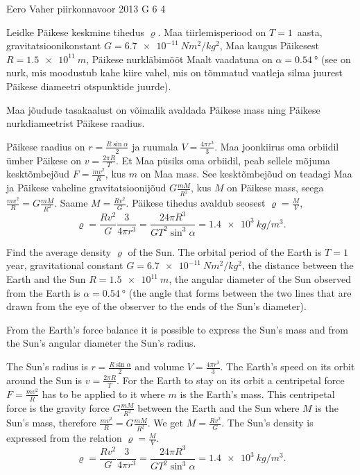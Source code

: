 {Eero Vaher} %
{piirkonnavoor} %
{2013} %
{G 6} %
{4} %
{
\ifStatement
Leidke Päikese keskmine tihedus $\varrho$. Maa
tiirlemisperiood on $T=1$~aasta, gravitatsioonikonstant 
$G=\SI{6.7e-11}{N m^2/kg^2}$, Maa kaugus Päikesest $R=\SI{1.5e11}{m}$, Päikese nurkläbimõõt Maalt vaadatuna on
$\alpha=\SI{0,54}{\degree}$ (see on nurk, mis moodustub kahe kiire vahel, mis on tõmmatud
vaatleja silma juurest Päikese diameetri otspunktide juurde).
\fi


\ifHint
Maa jõudude tasakaalust on võimalik avaldada Päikese mass ning Päikese nurkdiameetrist Päikese raadius.
\fi


\ifSolution
Päikese raadius on $r=\frac{R\sin\alpha}{2}$ ja ruumala $V=\frac{4\pi r^3}{3}$.
Maa joonkiirus oma orbiidil ümber Päikese on $v=\frac{2\pi R}{T}$. Et Maa püsiks oma orbiidil, peab sellele mõjuma kesktõmbejõud $F=\frac{mv^2}{R}$, kus $m$ on Maa mass. See kesktõmbejõud on teadagi Maa ja Päikese vaheline gravitatsioonijõud $G\frac{mM}{R^2}$, kus $M$ on Päikese mass, seega $\frac{mv^2}{R}=G\frac{mM}{R^2}$. Saame $M=\frac{Rv^2}{G}$.
Päikese tihedus avaldub seosest $\varrho=\frac{M}{V}$, $$\varrho=\frac{Rv^2}{G} \frac{3}{4\pi r^3}=\frac{24 \pi R^3}{G T^2 \sin^3 \alpha}=\SI{1,4e3}{kg/m^3}.$$
\fi


\ifEngStatement
Find the average density $\varrho$ of the Sun. The orbital period of the Earth is $T=1$ year, gravitational constant $G=\SI{6.7e-11}{N m^2/kg^2}$, the distance between the Earth and the Sun $R=\SI{1.5e11}{m}$, the angular diameter of the Sun observed from the Earth is $\alpha=\SI{0,54}{\degree}$ (the angle that forms between the two lines that are drawn from the eye of the observer to the ends of the Sun’s diameter).
\fi


\ifEngHint
From the Earth’s force balance it is possible to express the Sun’s mass and from the Sun’s angular diameter the Sun’s radius.
\fi


\ifEngSolution
The Sun’s radius is $r=\frac{R\sin\alpha}{2}$ and volume $V=\frac{4\pi r^3}{3}$. The Earth’s speed on its orbit around the Sun is $v=\frac{2\pi R}{T}$. For the Earth to stay on its orbit a centripetal force $F=\frac{mv^2}{R}$ has to be applied to it where $m$ is the Earth’s mass. This centripetal force is the gravity force $G\frac{mM}{R^2}$ between the Earth and the Sun where $M$ is the Sun’s mass, therefore $\frac{mv^2}{R}=G\frac{mM}{R^2}$. We get $M=\frac{Rv^2}{G}$. The Sun’s density is expressed from the relation $\varrho=\frac{M}{V}$. 
$$\varrho=\frac{Rv^2}{G} \frac{3}{4\pi r^3}=\frac{24 \pi R^3}{G T^2 \sin^3 \alpha}=\SI{1,4e3}{kg/m^3}.$$
\fi
}